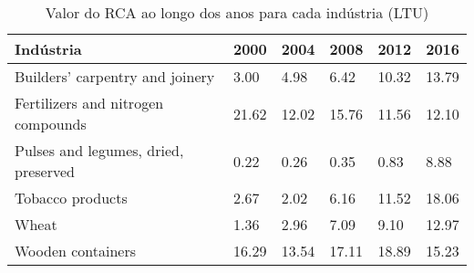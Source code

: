 \begin{table}
\centering
\caption{Valor do RCA ao longo dos anos para cada indústria (LTU)}
\label{tab:ex3-tempo-LTU}
\begin{tabular}{p{6cm}p{1.5cm}p{1.5cm}p{1.5cm}p{1.5cm}p{1.5cm}}
\toprule
                           Indústria &  2000 &  2004 &  2008 &  2012 &  2016 \\
\midrule
     Builders' carpentry and joinery &  3.00 &  4.98 &  6.42 & 10.32 & 13.79 \\
  Fertilizers and nitrogen compounds & 21.62 & 12.02 & 15.76 & 11.56 & 12.10 \\
Pulses and legumes, dried, preserved &  0.22 &  0.26 &  0.35 &  0.83 &  8.88 \\
                    Tobacco products &  2.67 &  2.02 &  6.16 & 11.52 & 18.06 \\
                               Wheat &  1.36 &  2.96 &  7.09 &  9.10 & 12.97 \\
                   Wooden containers & 16.29 & 13.54 & 17.11 & 18.89 & 15.23 \\
\bottomrule
\end{tabular}
\end{table}
